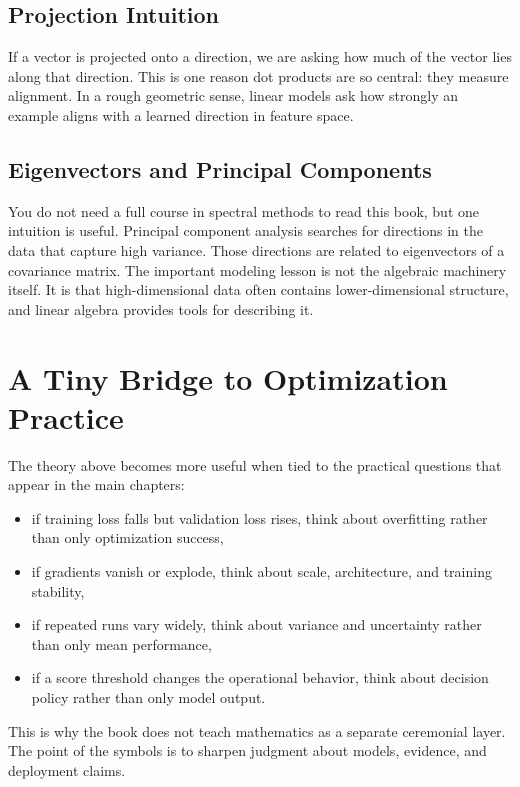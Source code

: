 \subsection{Projection Intuition}

If a vector is projected onto a direction, we are asking how much of the vector lies along that direction. This is one reason dot products are so central: they measure alignment. In a rough geometric sense, linear models ask how strongly an example aligns with a learned direction in feature space.

\subsection{Eigenvectors and Principal Components}

You do not need a full course in spectral methods to read this book, but one intuition is useful. Principal component analysis searches for directions in the data that capture high variance. Those directions are related to eigenvectors of a covariance matrix. The important modeling lesson is not the algebraic machinery itself. It is that high-dimensional data often contains lower-dimensional structure, and linear algebra provides tools for describing it.

\section{A Tiny Bridge to Optimization Practice}

The theory above becomes more useful when tied to the practical questions that appear in the main chapters:
\begin{itemize}[leftmargin=*]
\item if training loss falls but validation loss rises, think about overfitting rather than only optimization success,
\item if gradients vanish or explode, think about scale, architecture, and training stability,
\item if repeated runs vary widely, think about variance and uncertainty rather than only mean performance,
\item if a score threshold changes the operational behavior, think about decision policy rather than only model output.
\end{itemize}

This is why the book does not teach mathematics as a separate ceremonial layer. The point of the symbols is to sharpen judgment about models, evidence, and deployment claims.

